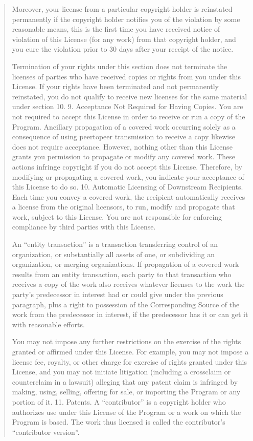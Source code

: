 \documentclass[letterpaper,10pt,english]{sphinxmanual}
\begin{document}
\begin{quote}
Moreover, your license from a particular copyright holder is reinstated permanently if the copyright holder notifies you of the violation by some reasonable means, this is the first time you have received notice of violation of this License (for any work) from that copyright holder, and you cure the violation prior to 30 days after your receipt of the notice.

Termination of your rights under this section does not terminate the licenses of parties who have received copies or rights from you under this License. If your rights have been terminated and not permanently reinstated, you do not qualify to receive new licenses for the same material under section 10.
9. Acceptance Not Required for Having Copies.
You are not required to accept this License in order to receive or run a copy of the Program. Ancillary propagation of a covered work occurring solely as a consequence of using peer\sphinxhyphen{}to\sphinxhyphen{}peer transmission to receive a copy likewise does not require acceptance. However, nothing other than this License grants you permission to propagate or modify any covered work. These actions infringe copyright if you do not accept this License. Therefore, by modifying or propagating a covered work, you indicate your acceptance of this License to do so.
10. Automatic Licensing of Downstream Recipients.
Each time you convey a covered work, the recipient automatically receives a license from the original licensors, to run, modify and propagate that work, subject to this License. You are not responsible for enforcing compliance by third parties with this License.

An “entity transaction” is a transaction transferring control of an organization, or substantially all assets of one, or subdividing an organization, or merging organizations. If propagation of a covered work results from an entity transaction, each party to that transaction who receives a copy of the work also receives whatever licenses to the work the party’s predecessor in interest had or could give under the previous paragraph, plus a right to possession of the Corresponding Source of the work from the predecessor in interest, if the predecessor has it or can get it with reasonable efforts.

You may not impose any further restrictions on the exercise of the rights granted or affirmed under this License. For example, you may not impose a license fee, royalty, or other charge for exercise of rights granted under this License, and you may not initiate litigation (including a cross\sphinxhyphen{}claim or counterclaim in a lawsuit) alleging that any patent claim is infringed by making, using, selling, offering for sale, or importing the Program or any portion of it.
11. Patents.
A “contributor” is a copyright holder who authorizes use under this License of the Program or a work on which the Program is based. The work thus licensed is called the contributor’s “contributor version”.


\end{quote}
\end{document}
